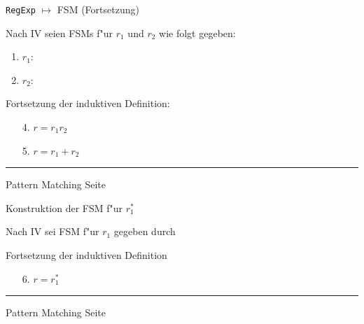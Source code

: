 \begin{slide}{}
\normalsize

\begin{center}
\texttt{RegExp} $\mapsto$ FSM (Fortsetzung)
\end{center}
\vspace*{0.5cm}

\footnotesize
Nach IV seien FSMs f"ur $r_1$ und $r_2$  wie folgt gegeben:
\begin{enumerate}
\item $r_1$: \vspace*{-0.7cm}

      \hspace*{1.3cm} 
\item $r_2$: \vspace*{-0.7cm}

      \hspace*{1.3cm} 
\end{enumerate}
Fortsetzung der induktiven Definition:
\begin{enumerate}
\item[4.] $r = r_1r_2$ 

      \hspace*{-2cm} 
\item[5.] $r = r_1 + r_2$

      \hspace*{-2cm} 
\end{enumerate}


\vspace*{\fill}
\tiny \addtocounter{mypage}{1}
\rule{17cm}{1mm}
Pattern Matching \hspace*{\fill} Seite 
\end{slide}


\begin{slide}{}
\normalsize

\begin{center}
Konstruktion der FSM f"ur $r_1^*$
\end{center}
\vspace*{0.5cm}

\footnotesize
Nach IV sei FSM f"ur $r_1$ gegeben durch

\hspace*{1.3cm} 

Fortsetzung der induktiven Definition
\begin{enumerate}
\item[6.] $r = r_1^*$ \vspace*{-1.5cm}

          \hspace*{5.3cm}  
\end{enumerate}

\vspace*{\fill}
\tiny \addtocounter{mypage}{1}
\rule{17cm}{1mm}
Pattern Matching \hspace*{\fill} Seite 
\end{slide}


